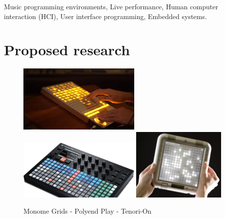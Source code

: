 \documentclass[journal,onecolumn]{IEEEtran}
\begin{document}
\begin{IEEEkeywords}
Music programming environments, Live performance, Human computer interaction (HCI), User interface programming, Embedded systems.
\end{IEEEkeywords}

\newpage
\section{Proposed research} %

\begin{figure}[!t]
\centering
\includegraphics[width=6cm]{pictures/monome-gridlab.jpg}
\includegraphics[width=6cm]{pictures/polyend-play.png}
\includegraphics[width=4.6cm]{pictures/tenori-on.jpg}
\caption[]{Monome Grids
- Polyend Play
- Tenori-On
}
\label{fig:seqs}
\end{figure}
\end{document}
